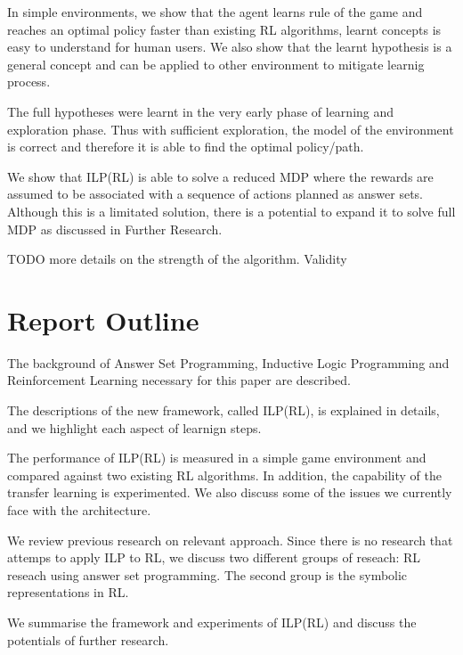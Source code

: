 In simple environments, we show that the agent learns rule of the game and reaches an optimal policy faster than existing RL algorithms, learnt concepts is easy to understand for human users.
We also show that the learnt hypothesis is a general concept and can be applied to other environment to mitigate learnig process.

The full hypotheses were learnt in the very early phase of learning and exploration phase. Thus with sufficient exploration, the model of the environment is correct
and therefore it is able to find the optimal policy/path. 

We show that ILP(RL) is able to solve a reduced MDP where the rewards are assumed to be associated with a sequence of actions planned as answer sets.
Although this is a limitated solution, there is a potential to expand it to solve full MDP as discussed in Further Research. 

TODO more details on the strength of the algorithm. 
Validity


\section{Report Outline}
\begin{customthm}{2}
The background of Answer Set Programming, Inductive Logic Programming and Reinforcement Learning necessary for this paper are described.
\end{customthm}

\begin{customthm}{3}
The descriptions of the new framework, called ILP(RL), is explained in details, and we highlight each aspect of learnign steps. 
\end{customthm}

\begin{customthm}{4}
The performance of ILP(RL) is measured in a simple game environment and compared against two existing RL algorithms. In addition, the capability of the transfer learning is experimented.
We also discuss some of the issues we currently face with the architecture.
\end{customthm}

\begin{customthm}{5}
We review previous research on relevant approach. Since there is no research that attemps to apply ILP to RL, we discuss two different groups of reseach: 
RL reseach using answer set programming. The second group is the symbolic representations in RL.  
\end{customthm}

\begin{customthm}{6}
We summarise the framework and experiments of ILP(RL) and discuss the potentials of further research. 
\end{customthm}